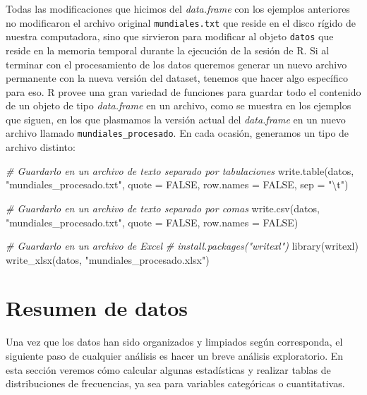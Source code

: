 \documentclass[
]{book}
\newenvironment{Shaded}{\begin{snugshade}}{\end{snugshade}}
\newcommand{\AttributeTok}[1]{\textcolor[rgb]{0.77,0.63,0.00}{#1}}
\newcommand{\CommentTok}[1]{\textcolor[rgb]{0.56,0.35,0.01}{\textit{#1}}}
\newcommand{\ConstantTok}[1]{\textcolor[rgb]{0.00,0.00,0.00}{#1}}
\newcommand{\FunctionTok}[1]{\textcolor[rgb]{0.00,0.00,0.00}{#1}}
\newcommand{\NormalTok}[1]{#1}
\newcommand{\SpecialCharTok}[1]{\textcolor[rgb]{0.00,0.00,0.00}{#1}}
\newcommand{\StringTok}[1]{\textcolor[rgb]{0.31,0.60,0.02}{#1}}
\begin{document}
Todas las modificaciones que hicimos del \emph{data.frame} con los ejemplos anteriores no modificaron el archivo original \texttt{mundiales.txt} que reside en el disco rígido de nuestra computadora, sino que sirvieron para modificar al objeto \texttt{datos} que reside en la memoria temporal durante la ejecución de la sesión de R. Si al terminar con el procesamiento de los datos queremos generar un nuevo archivo permanente con la nueva versión del dataset, tenemos que hacer algo específico para eso. R provee una gran variedad de funciones para guardar todo el contenido de un objeto de tipo \emph{data.frame} en un archivo, como se muestra en los ejemplos que siguen, en los que plasmamos la versión actual del \emph{data.frame} en un nuevo archivo llamado \texttt{mundiales\_procesado}. En cada ocasión, generamos un tipo de archivo distinto:

\begin{Shaded}
\begin{Highlighting}[]
\CommentTok{\# Guardarlo en un archivo de texto separado por tabulaciones}
\FunctionTok{write.table}\NormalTok{(datos, }\StringTok{"mundiales\_procesado.txt"}\NormalTok{, }\AttributeTok{quote =} \ConstantTok{FALSE}\NormalTok{, }\AttributeTok{row.names =} \ConstantTok{FALSE}\NormalTok{, }\AttributeTok{sep =} \StringTok{"}\SpecialCharTok{\textbackslash{}t}\StringTok{"}\NormalTok{)}

\CommentTok{\# Guardarlo en un archivo de texto separado por comas}
\FunctionTok{write.csv}\NormalTok{(datos, }\StringTok{"mundiales\_procesado.txt"}\NormalTok{, }\AttributeTok{quote =} \ConstantTok{FALSE}\NormalTok{, }\AttributeTok{row.names =} \ConstantTok{FALSE}\NormalTok{)}

\CommentTok{\# Guardarlo en un archivo de Excel}
\CommentTok{\# install.packages("writexl")}
\FunctionTok{library}\NormalTok{(writexl)}
\FunctionTok{write\_xlsx}\NormalTok{(datos, }\StringTok{"mundiales\_procesado.xlsx"}\NormalTok{)}
\end{Highlighting}
\end{Shaded}

\hypertarget{resumen-de-datos}{%
\section{Resumen de datos}\label{resumen-de-datos}}

Una vez que los datos han sido organizados y limpiados según corresponda, el siguiente paso de cualquier análisis es hacer un breve análisis exploratorio. En esta sección veremos cómo calcular algunas estadísticas y realizar tablas de distribuciones de frecuencias, ya sea para variables categóricas o cuantitativas.
\end{document}
